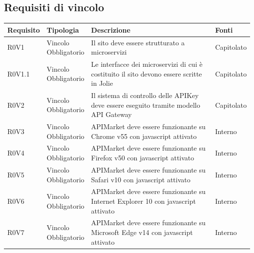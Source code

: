\documentclass[12pt,a4paper,titlepage]{article}
\newcommand{\minitab}[2][1]{\begin{tabular}#1 #2\end{tabular}}
\begin{document}
	\subsection{Requisiti di vincolo}
	{\renewcommand\arraystretch{1.2}  %
		\small
		\begin{longtable}{|m{5em}|m{6em}|m{28em}|m{5em}|}
			\hline
			\textbf{Requisito} & \textbf{Tipologia}  & \textbf{Descrizione} & \textbf{Fonti} \\
			\hline
			R0V1 & \minitab[c]{Vincolo\\Obbligatorio} & Il sito deve essere strutturato a microservizi & Capitolato\\
			\hline
			R0V1.1 & \minitab[c]{Vincolo\\Obbligatorio} & Le interfacce dei microservizi di cui è costituito il sito devono essere scritte in Jolie & Capitolato\\
			\hline
			R0V2 & \minitab[c]{Vincolo\\Obbligatorio} & Il sistema di controllo delle APIKey deve essere eseguito tramite modello API Gateway & Capitolato\\
			\hline
			R0V3 & \minitab[c]{Vincolo\\Obbligatorio} & APIMarket deve essere funzionante su Chrome v55 con javascript attivato & Interno\\
			\hline
			R0V4 & \minitab[c]{Vincolo\\Obbligatorio} & APIMarket deve essere funzionante su Firefox v50 con javascript attivato & Interno\\
			\hline
			R0V5 & \minitab[c]{Vincolo\\Obbligatorio} & APIMarket deve essere funzionante su Safari v10 con javascript attivato & Interno\\
			\hline
			R0V6 & \minitab[c]{Vincolo\\Obbligatorio} & APIMarket deve essere funzionante su Internet Explorer 10 con javascript attivato & Interno\\
			\hline
			R0V7 & \minitab[c]{Vincolo\\Obbligatorio} & APIMarket deve essere funzionante su Microsoft Edge v14 con javascript attivato & Interno\\
			\hline
		\end{longtable}
	}
\end{document}
